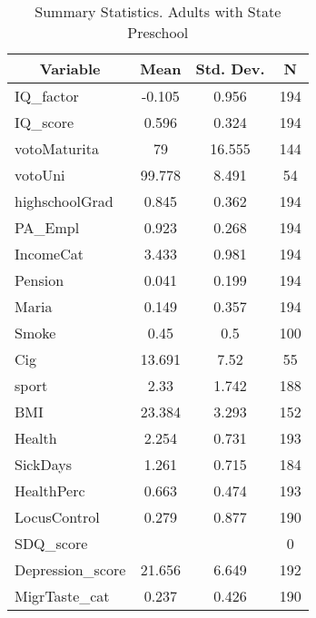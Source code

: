 
\begin{table}[htbp]\centering \caption{Summary Statistics. Adults with State Preschool \label{schoolAdultmaternaStat}}
\begin{tabular}{l c c  c}\hline\hline
\multicolumn{1}{c}{\textbf{Variable}} & \textbf{Mean}
 & \textbf{Std. Dev.} & \textbf{N}\\ \hline
IQ\_factor & -0.105 & 0.956  & 194\\
IQ\_score & 0.596 & 0.324  & 194\\
votoMaturita & 79 & 16.555  & 144\\
votoUni & 99.778 & 8.491  & 54\\
highschoolGrad & 0.845 & 0.362  & 194\\
PA\_Empl & 0.923 & 0.268  & 194\\
IncomeCat & 3.433 & 0.981  & 194\\
Pension & 0.041 & 0.199  & 194\\
Maria & 0.149 & 0.357  & 194\\
Smoke & 0.45 & 0.5  & 100\\
Cig & 13.691 & 7.52  & 55\\
sport & 2.33 & 1.742  & 188\\
BMI & 23.384 & 3.293  & 152\\
Health & 2.254 & 0.731  & 193\\
SickDays & 1.261 & 0.715  & 184\\
HealthPerc & 0.663 & 0.474  & 193\\
LocusControl & 0.279 & 0.877  & 190\\
SDQ\_score &  &   & 0\\
Depression\_score & 21.656 & 6.649  & 192\\
MigrTaste\_cat & 0.237 & 0.426  & 190\\
\hline\end{tabular}
\end{table}
